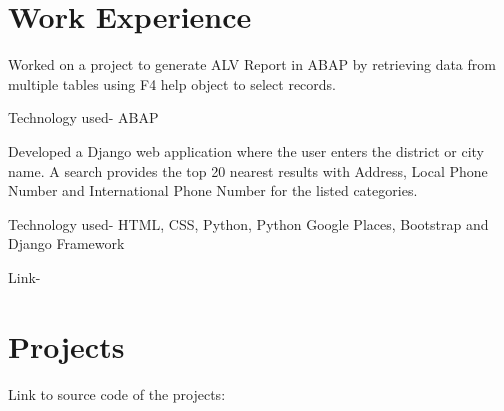 \documentclass[]{resume-openfont}
\begin{document}
\begin{minipage}[t]{0.33\textwidth}
%
%

\end{minipage} 
\hfill
\begin{minipage}[t]{0.66\textwidth} 


\section{Work Experience}

Worked on a project to generate ALV Report in ABAP by retrieving data from multiple tables using F4 help object to select records.
\vspace{\topsep} %
\begin{tightemize}
\item Technology used- ABAP
\end{tightemize}
\sectionsep

Developed a Django web application where the user enters the district or city name. A search provides the top 20 nearest results with Address, Local Phone Number and International Phone Number for the listed categories. 
\begin{tightemize}
\item Technology used- HTML, CSS, Python, Python Google Places, Bootstrap and Django Framework
\item Link- \href{https://find-my-perfect-place.herokuapp.com/}{}
\end{tightemize}

\sectionsep


\section{Projects}

Link to source code of the projects: \href{https://github.com/Diksha-Rathi}{} \sectionsep


\end{minipage}
\end{document}
